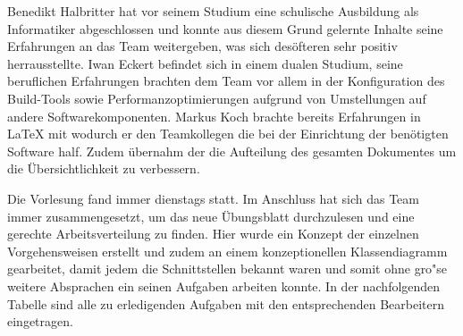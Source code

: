 Benedikt Halbritter hat vor seinem Studium eine schulische Ausbildung als Informatiker abgeschlossen und konnte aus diesem Grund gelernte Inhalte seine Erfahrungen an das Team weitergeben, was sich des\"ofteren sehr positiv herrausstellte.
Iwan Eckert befindet sich in einem dualen Studium, seine beruflichen Erfahrungen brachten dem Team vor allem in der Konfiguration des Build-Tools sowie Performanzoptimierungen aufgrund von Umstellungen auf andere Softwarekomponenten.
Markus Koch brachte bereits Erfahrungen in LaTeX mit wodurch er den Teamkollegen die bei der Einrichtung der ben\"otigten Software half.
Zudem \"ubernahm der die Aufteilung des gesamten Dokumentes um die \"Ubersichtlichkeit zu verbessern.

Die Vorlesung fand immer dienstags statt.
Im Anschluss hat sich das Team immer zusammengesetzt, um das neue \"Ubungsblatt durchzulesen und eine gerechte Arbeitsverteilung zu finden.
Hier wurde ein Konzept der einzelnen Vorgehensweisen erstellt und zudem an einem konzeptionellen Klassendiagramm gearbeitet, damit jedem die Schnittstellen bekannt waren und somit ohne gro"se weitere Absprachen ein seinen Aufgaben arbeiten konnte.
In der nachfolgenden Tabelle sind alle zu erledigenden Aufgaben mit den entsprechenden Bearbeitern eingetragen.


